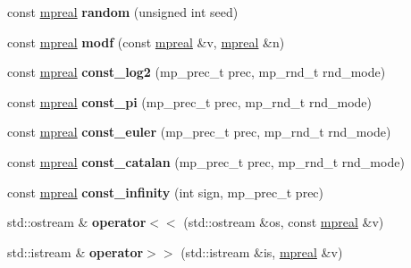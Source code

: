 \begin{DoxyCompactItemize}
const \hyperlink{classmpfr_1_1mpreal}{mpreal} {\bfseries random} (unsigned int seed)
\item 
\mbox{\label{classmpfr_1_1mpreal_ab5984116e4ff1e9056f21b8c76579861}} 
const \hyperlink{classmpfr_1_1mpreal}{mpreal} {\bfseries modf} (const \hyperlink{classmpfr_1_1mpreal}{mpreal} \&v, \hyperlink{classmpfr_1_1mpreal}{mpreal} \&n)
\item 
\mbox{\label{classmpfr_1_1mpreal_a14a6f8cb5938d03f09b1fce95c373fc9}} 
const \hyperlink{classmpfr_1_1mpreal}{mpreal} {\bfseries const\+\_\+log2} (mp\+\_\+prec\+\_\+t prec, mp\+\_\+rnd\+\_\+t rnd\+\_\+mode)
\item 
\mbox{\label{classmpfr_1_1mpreal_a88e3190a8cfb8458c5b08e9ebc6cfe84}} 
const \hyperlink{classmpfr_1_1mpreal}{mpreal} {\bfseries const\+\_\+pi} (mp\+\_\+prec\+\_\+t prec, mp\+\_\+rnd\+\_\+t rnd\+\_\+mode)
\item 
\mbox{\label{classmpfr_1_1mpreal_aee025a363356c1a693367c06b5837d0f}} 
const \hyperlink{classmpfr_1_1mpreal}{mpreal} {\bfseries const\+\_\+euler} (mp\+\_\+prec\+\_\+t prec, mp\+\_\+rnd\+\_\+t rnd\+\_\+mode)
\item 
\mbox{\label{classmpfr_1_1mpreal_a47ecddda73eabbd96fcf18b85335e343}} 
const \hyperlink{classmpfr_1_1mpreal}{mpreal} {\bfseries const\+\_\+catalan} (mp\+\_\+prec\+\_\+t prec, mp\+\_\+rnd\+\_\+t rnd\+\_\+mode)
\item 
\mbox{\label{classmpfr_1_1mpreal_a3c39e7991c240d42dd568412a7a4f41b}} 
const \hyperlink{classmpfr_1_1mpreal}{mpreal} {\bfseries const\+\_\+infinity} (int sign, mp\+\_\+prec\+\_\+t prec)
\item 
\mbox{\label{classmpfr_1_1mpreal_a777669be7a1401649a85a77e148f48c0}} 
std\+::ostream \& {\bfseries operator$<$$<$} (std\+::ostream \&os, const \hyperlink{classmpfr_1_1mpreal}{mpreal} \&v)
\item 
\mbox{\label{classmpfr_1_1mpreal_a4794a8726e371763295dea52873c78a5}} 
std\+::istream \& {\bfseries operator$>$$>$} (std\+::istream \&is, \hyperlink{classmpfr_1_1mpreal}{mpreal} \&v)

\end{DoxyCompactItemize}
